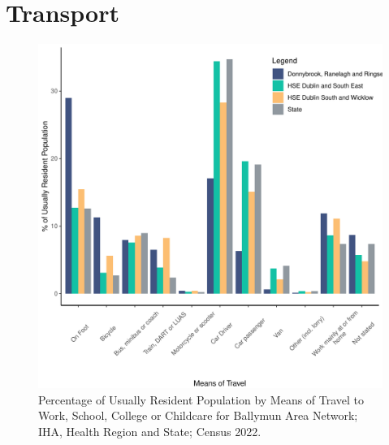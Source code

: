 \documentclass{article}
\begin{document}
\section{Transport}\label{sect:Trans}
\begin{figure}[H]
	\centering
	\includegraphics[width = 120mm]{../figures/TravelED.pdf}
	\caption{Percentage of Usually Resident Population by Means of Travel to Work, School, College or Childcare for Ballymun Area Network; IHA, Health Region and State; Census 2022.}
	\label{fig:vbnv}
	\end{figure}
\end{document}
